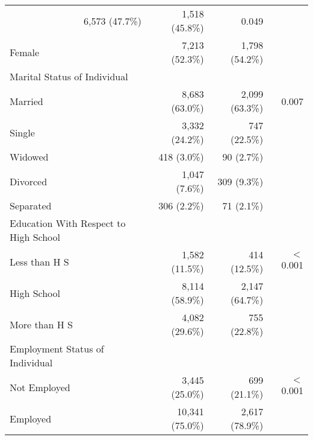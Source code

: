 \begin{tabular}{llll}
  \multicolumn{1}{r}{6,573 (47.7\%)} &
  \multicolumn{1}{r}{1,518 (45.8\%)} &
  \multicolumn{1}{r}{0.049} \\
\multicolumn{1}{l}{\hspace{1em}Female} &
  \multicolumn{1}{r}{7,213 (52.3\%)} &
  \multicolumn{1}{r}{1,798 (54.2\%)} &
  \multicolumn{1}{r}{} \\
\multicolumn{1}{l}{Marital Status of Individual} &
  \multicolumn{1}{r}{} &
  \multicolumn{1}{r}{} &
  \multicolumn{1}{r}{} \\
\multicolumn{1}{l}{\hspace{1em}Married} &
  \multicolumn{1}{r}{8,683 (63.0\%)} &
  \multicolumn{1}{r}{2,099 (63.3\%)} &
  \multicolumn{1}{r}{0.007} \\
\multicolumn{1}{l}{\hspace{1em}Single} &
  \multicolumn{1}{r}{3,332 (24.2\%)} &
  \multicolumn{1}{r}{747 (22.5\%)} &
  \multicolumn{1}{r}{} \\
\multicolumn{1}{l}{\hspace{1em}Widowed} &
  \multicolumn{1}{r}{418 (3.0\%)} &
  \multicolumn{1}{r}{90 (2.7\%)} &
  \multicolumn{1}{r}{} \\
\multicolumn{1}{l}{\hspace{1em}Divorced} &
  \multicolumn{1}{r}{1,047 (7.6\%)} &
  \multicolumn{1}{r}{309 (9.3\%)} &
  \multicolumn{1}{r}{} \\
\multicolumn{1}{l}{\hspace{1em}Separated} &
  \multicolumn{1}{r}{306 (2.2\%)} &
  \multicolumn{1}{r}{71 (2.1\%)} &
  \multicolumn{1}{r}{} \\
\multicolumn{1}{l}{Education With Respect to High School} &
  \multicolumn{1}{r}{} &
  \multicolumn{1}{r}{} &
  \multicolumn{1}{r}{} \\
\multicolumn{1}{l}{\hspace{1em}Less than H S} &
  \multicolumn{1}{r}{1,582 (11.5\%)} &
  \multicolumn{1}{r}{414 (12.5\%)} &
  \multicolumn{1}{r}{$<$0.001} \\
\multicolumn{1}{l}{\hspace{1em}High School} &
  \multicolumn{1}{r}{8,114 (58.9\%)} &
  \multicolumn{1}{r}{2,147 (64.7\%)} &
  \multicolumn{1}{r}{} \\
\multicolumn{1}{l}{\hspace{1em}More than H S} &
  \multicolumn{1}{r}{4,082 (29.6\%)} &
  \multicolumn{1}{r}{755 (22.8\%)} &
  \multicolumn{1}{r}{} \\
\multicolumn{1}{l}{Employment Status of Individual} &
  \multicolumn{1}{r}{} &
  \multicolumn{1}{r}{} &
  \multicolumn{1}{r}{} \\
\multicolumn{1}{l}{\hspace{1em}Not Employed} &
  \multicolumn{1}{r}{3,445 (25.0\%)} &
  \multicolumn{1}{r}{699 (21.1\%)} &
  \multicolumn{1}{r}{$<$0.001} \\
\multicolumn{1}{l}{\hspace{1em}Employed} &
  \multicolumn{1}{r}{10,341 (75.0\%)} &
  \multicolumn{1}{r}{2,617 (78.9\%)} &
  \multicolumn{1}{r}{} \\
\cmidrule{1-4}
\end{tabular}
